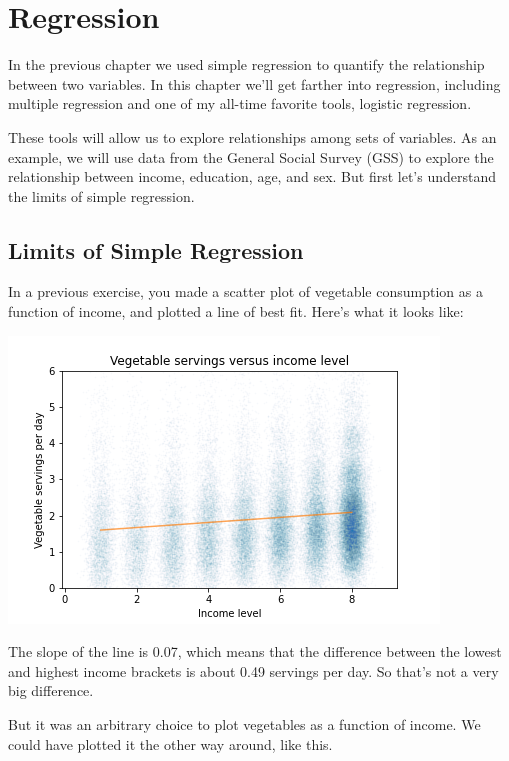 \hypertarget{regression}{%
\chapter{Regression}\label{regression}}

In the previous chapter we used simple regression to quantify the
relationship between two variables. In this chapter we'll get farther
into regression, including multiple regression and one of my all-time
favorite tools, logistic regression.

These tools will allow us to explore relationships among sets of
variables. As an example, we will use data from the General Social
Survey (GSS) to explore the relationship between income, education, age,
and sex. But first let's understand the limits of simple regression.

\hypertarget{limits-of-simple-regression}{%
\section{Limits of Simple Regression}\label{limits-of-simple-regression}}

In a previous exercise, you made a scatter plot of vegetable consumption
as a function of income, and plotted a line of best fit. Here's what it
looks like:

\includegraphics{chapters/figs/fig09-01.png}

The slope of the line is 0.07, which means that the difference between
the lowest and highest income brackets is about 0.49 servings per day.
So that's not a very big difference.

But it was an arbitrary choice to plot vegetables as a function of
income. We could have plotted it the other way around, like this.

